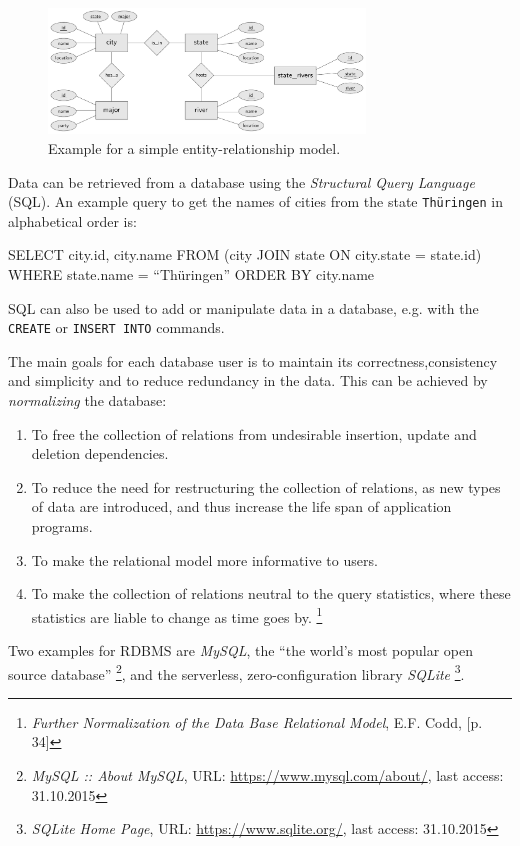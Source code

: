 \begin{figure}[ht]
  \centering
  \includegraphics[width=0.75\textwidth]{graphics/basics/er_example}
  \caption{Example for a simple entity-relationship model.}
  \label{fig:er_example}
\end{figure}

Data can be retrieved from a database using the \emph{Structural Query Language} (SQL). An example query to get the names of cities from the state \texttt{Thüringen} in alphabetical order is:
\begin{verbatimtab}
  SELECT     city.id, city.name
  FROM       (city JOIN state ON city.state = state.id)
  WHERE      state.name = ``Thüringen''
  ORDER BY   city.name
\end{verbatimtab}

SQL can also be used to add or manipulate data in a database, e.g. with the \texttt{CREATE} or \texttt{INSERT INTO} commands.

The main goals for each database user is to maintain its correctness,consistency and simplicity and to reduce redundancy in the data. This can be achieved by \emph{normalizing} the database:
\begin{enumerate}
  \item To free the collection of relations from undesirable insertion, update and deletion dependencies.
  \item To reduce the need for restructuring the collection of relations, as new types of data are introduced, and thus increase the life span of application programs.
  \item To make the relational model more informative to users.
  \item To make the collection of relations neutral to the query statistics, where these statistics are liable to change as time goes by.
\footnote{
  \textit{Further Normalization of the Data Base Relational Model},
  E.F. Codd,
  [p. 34]
}
\end{enumerate}

Two examples for RDBMS are \emph{MySQL}, the ``the world's most popular open source database''
\footnote{
  \textit{MySQL :: About MySQL},
  URL: \url{https://www.mysql.com/about/},
  last access: 31.10.2015
}, and the serverless, zero-configuration library \emph{SQLite}
\footnote{
  \textit{SQLite Home Page},
  URL: \url{https://www.sqlite.org/},
  last access: 31.10.2015
}.

